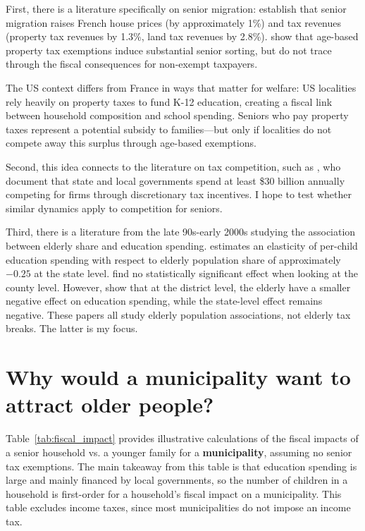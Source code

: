 \documentclass[11pt]{article}
\begin{document}
\begin{enumerate}
    
    First, there is a literature specifically on senior migration: \citet{BadillaMarotoFaberLevyMunoz2024} establish that senior migration raises French house prices (by approximately 1\%) and tax revenues (property tax revenues by 1.3\%, land tax revenues by 2.8\%). \citet{banzhaf2021age} show that age-based property tax exemptions induce substantial senior sorting, but do not trace through the fiscal consequences for non-exempt taxpayers. 


    The US context differs from France in ways that matter for welfare: US localities rely heavily on property taxes to fund K-12 education, creating a fiscal link between household composition and school spending. Seniors who pay property taxes represent a potential subsidy to families---but only if localities do not compete away this surplus through age-based exemptions.

    Second, this idea connects to the literature on tax competition, such as \citet{SlatteryZidar2020}, who document that state and local governments spend at least \$30 billion annually competing for firms through discretionary tax incentives. I hope to test whether similar dynamics apply to competition for seniors.


    Third, there is a literature from the late 90s-early 2000s studying the association between elderly share and education spending. \citet{Poterba1997} estimates an elasticity of per-child education spending with respect to elderly population share of approximately $-0.25$ at the state level. \citet{LaddMurray2001} find no statistically significant effect when looking at the county level. However, \citet{HarrisEvansSchwab2001} show that at the district level, the elderly have a smaller negative effect on education spending, while the state-level effect remains negative. These papers all study elderly population associations, not elderly tax breaks. The latter is my focus.

    \end{enumerate}
\section{Why would a municipality want to attract older people? }
Table~\ref{tab:fiscal_impact} provides illustrative calculations of the fiscal impacts of a senior household vs. a younger family for a \textbf{municipality}, assuming no senior tax exemptions. The main takeaway from this table is that education spending is large and mainly financed by local governments, so the number of children in a household is first-order for a household's fiscal impact on a municipality. This table excludes income taxes, since most municipalities do not impose an income tax.
\end{document}
